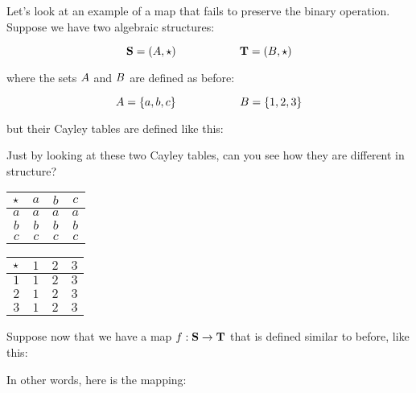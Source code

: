 \documentclass[../../../main.tex]{subfiles}
\begin{document}
\begin{example}

Let's look at an example of a map that fails to preserve the binary operation. Suppose we have two algebraic structures:

\begin{equation*}
  \algebra{S} = (\set{A}, \opSymbol/) \hskip 2cm \algebra{T} = (\set{B}, \opSymbol/)
\end{equation*}

where the sets $A$ and $B$ are defined as before:

\begin{equation*}
  A = \{ a, b, c \} \hskip 2cm B = \{ 1, 2, 3 \}
\end{equation*}

but their Cayley tables are defined like this:

\begin{ponder}
  Just by looking at these two Cayley tables, can you see how they are different in structure?
\end{ponder}

\begin{center}
  \begin{tabular}{| c || c | c | c | }
    \hline
    $\opSymbol/$ & $a$ & $b$ & $c$ \\ \hline \hline
    $a$          & $a$ & $a$ & $a$ \\ \hline
    $b$          & $b$ & $b$ & $b$ \\ \hline
    $c$          & $c$ & $c$ & $c$ \\ \hline
  \end{tabular}
  \hskip 2cm
  \begin{tabular}{| c || c | c | c | }
    \hline
    $\opSymbol/$ & $1$ & $2$ & $3$ \\ \hline \hline
    $1$          & $1$ & $2$ & $3$ \\ \hline
    $2$          & $1$ & $2$ & $3$ \\ \hline
    $3$          & $1$ & $2$ & $3$ \\ \hline
  \end{tabular}
\end{center}

Suppose now that we have a map $f: \mathbf{S} \rightarrow \mathbf{T}$ that is defined similar to before, like this:

\begin{aside}
  \begin{remark}
    In other words, here is the mapping:
    

\end{remark}
\end{aside}
\end{example}
\end{document}
